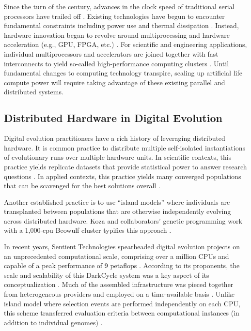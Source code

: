 Since %
the turn of the century, advances in the clock speed of traditional serial processors have trailed off \citep{sutter2005free}.
Existing technologies have begun to encounter fundamental constraints including power use and thermal dissipation \citep{markov2014limits}.
Instead, hardware innovation began to revolve around multiprocessing  \citep[p.55]{hennessy2011computer} and hardware acceleration (e.g., GPU, FPGA, etc.) \citep{che2008accelerating}.
For scientific and engineering applications, individual multiprocessors and accelerators are joined together with fast interconnects to yield so-called high-performance computing clusters \citep[p.436]{hennessy2011computer}.
Until fundamental changes to computing technology transpire, scaling up artificial life compute power will require taking advantage of these existing parallel and distributed systems.

\subsection{Distributed Hardware in Digital Evolution}

Digital evolution practitioners have a rich history of leveraging %
distributed hardware.
It is common practice to distribute multiple self-isolated instantiations of evolutionary runs over multiple hardware units.
In scientific contexts, this practice yields replicate datasets that provide statistical power to answer research questions \citep{dolson2017spatial}.
In applied contexts, this practice yields many converged populations that can be scavenged for the best solutions overall \citep{hornby2006automated}.

Another established practice is to use ``island models'' where individuals are transplanted between populations that are otherwise independently evolving across distributed hardware.
Koza and collaborators' genetic programming work with a 1,000-cpu Beowulf cluster typifies this approach \citep{bennett1999building}.

In recent years, Sentient Technologies spearheaded digital evolution projects on an unprecedented computational scale, comprising over a million CPUs and capable of a peak performance of 9 petaflops \citep{miikkulainen2019evolving}.
According to its proponents, the scale and scalability of this DarkCycle system was a key aspect of its conceptualization \citep{gilbert_2015}.
Much of the assembled infrastructure was pieced together from heterogeneous providers and employed on a time-available basis \citep{blondeau2012distributed}.
Unlike island model where selection events are performed independently on each CPU, this scheme transferred evaluation criteria between computational instances (in addition to individual genomes) \citep{hodjat2013distributed}.

